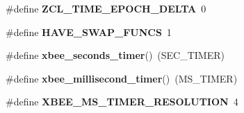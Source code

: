 \begin{DoxyCompactItemize}
$$\item 
\mbox{\label{group__hal__hcs08_ga503caf44f78cc52dc196c413cd6c78ab}} 
\#define {\bfseries Z\+C\+L\+\_\+\+T\+I\+M\+E\+\_\+\+E\+P\+O\+C\+H\+\_\+\+D\+E\+L\+TA}~0
\item 
\mbox{\label{group__hal__hcs08_gae06d582222a6c1b1aa2996a510e5a60c}} 
\#define {\bfseries H\+A\+V\+E\+\_\+\+S\+W\+A\+P\+\_\+\+F\+U\+N\+CS}~1
\item 
\mbox{\label{group__hal__hcs08_gae8fb830d9a707a0f6d60a2c480ed7dfc}} 
\#define {\bfseries xbee\+\_\+seconds\+\_\+timer}()~(S\+E\+C\+\_\+\+T\+I\+M\+ER)
\item 
\mbox{\label{group__hal__hcs08_gae68dcfee6e7c24b7a401c769c3fc1dd0}} 
\#define {\bfseries xbee\+\_\+millisecond\+\_\+timer}()~(M\+S\+\_\+\+T\+I\+M\+ER)
\item 
\mbox{\label{group__hal__hcs08_ga5cbeea4d9344138b657f78ad38813584}} 
\#define {\bfseries X\+B\+E\+E\+\_\+\+M\+S\+\_\+\+T\+I\+M\+E\+R\+\_\+\+R\+E\+S\+O\+L\+U\+T\+I\+ON}~4
\end{DoxyCompactItemize}

